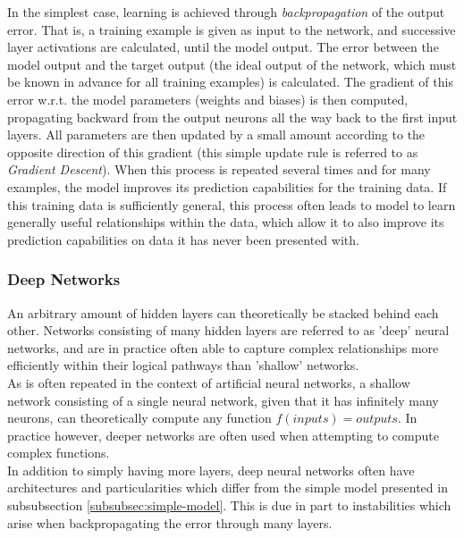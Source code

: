 In the simplest case, learning is achieved through \textit{backpropagation} of the output error. That is, a training example is given as input to the network, and successive layer activations are calculated, until the model output. The error between the model output and the target output (the ideal output of the network, which must be known in advance for all training examples) is calculated. The gradient of this error w.r.t. the model parameters (weights and biases) is then computed, propagating backward from the output neurons all the way back to the first input layers. All parameters are then updated by a small amount according to the opposite direction of this gradient (this simple update rule is referred to as \textit{Gradient Descent}). When this process is repeated several times and for many examples, the model improves its prediction capabilities for the training data. If this training data is sufficiently general, this process often leads to model to learn generally useful relationships within the data, which allow it to also improve its prediction capabilities on data it has never been presented with.\\

\subsubsection{Deep Networks}

An arbitrary amount of hidden layers can theoretically be stacked behind each other. Networks consisting of many hidden layers are referred to as 'deep' neural networks, and are in practice often able to capture complex relationships more efficiently within their logical pathways than 'shallow' networks.\\

As is often repeated in the context of artificial neural networks, a shallow network consisting of a single neural network, given that it has infinitely many neurons, can theoretically compute any function $f(inputs) = outputs$. In practice however, deeper networks are often used when attempting to compute complex functions.\\

In addition to simply having more layers, deep neural networks often have architectures and particularities which differ from the simple model presented in subsubsection \ref{subsubsec:simple-model}. This is due in part to instabilities which arise when backpropagating the error through many layers.\\ 

